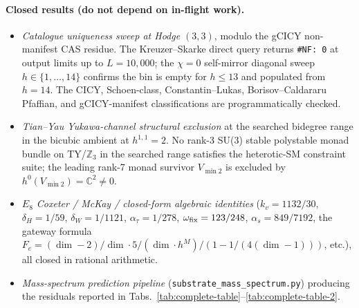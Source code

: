 ﻿\documentclass[reprint,amsmath,amssymb,aps,prd,longbibliography,floatfix]{revtex4-2}
\begin{document}
\paragraph{Closed results (do not depend on in-flight work).}
\begin{itemize}
\item \emph{Catalogue uniqueness sweep at Hodge $(3,3)$}, modulo the
gCICY non-manifest CAS residue. The Kreuzer--Skarke direct query
returns \texttt{\#NF: 0} at output limits up to $L=10{,}000$; the
$\chi=0$ self-mirror diagonal sweep $h \in \{1, \ldots, 14\}$
confirms the bin is empty for $h \le 13$ and populated from $h = 14$.
The CICY, Schoen-class, Constantin--Lukas, Borisov--Caldararu
Pfaffian, and gCICY-manifest classifications are programmatically
checked.
\item \emph{Tian--Yau Yukawa-channel structural exclusion} at the
searched bidegree range in the bicubic ambient at $h^{1,1}=2$. No
rank-3 SU(3) stable polystable monad bundle on TY/$\mathbb{Z}_3$ in
the searched range satisfies the heterotic-SM constraint suite; the
leading rank-7 monad survivor $V_{\min 2}$ is excluded by
$h^0(V_{\min 2}) = \mathbb{C}^2 \neq 0$.
\item \emph{$E_8$ Coxeter / McKay / closed-form algebraic identities}
($k_v = 1132/30$, $\delta_H = 1/59$, $\delta_W = 1/1121$,
$\alpha_\tau = 1/278$, $\omega_{\rm fix} = 123/248$, $\alpha_s = 849/7192$,
the gateway formula $F_e = (\dim-2)/\dim \cdot 5/(\dim \cdot h^M) /
(1 - 1/(4(\dim-1)))$, etc.), all closed in rational arithmetic.
\item \emph{Mass-spectrum prediction pipeline} (\texttt{substrate\_mass\_spectrum.py})
producing the residuals reported in
Tabs.~\ref{tab:complete-table}--\ref{tab:complete-table-2}.
\end{itemize}
\end{document}
